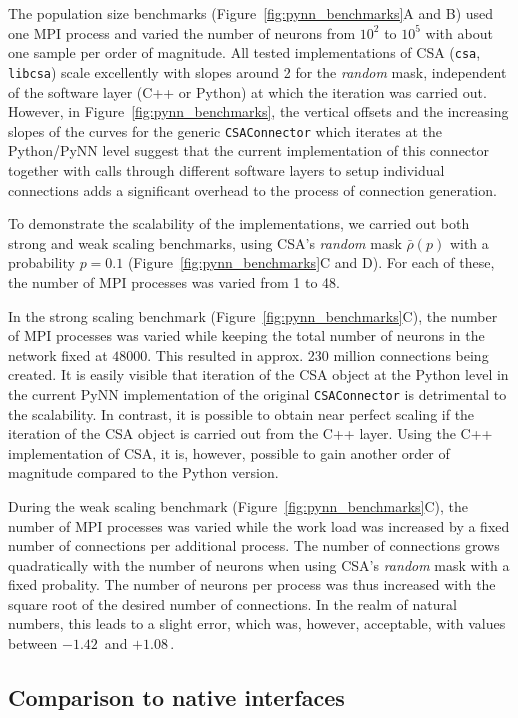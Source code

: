 \documentclass{frontiersSCNS} %
\newcommand{\permil}{\,\textperthousand\xspace}
\newcommand{\Figure}[2]{Figure~\ref{#2}}
\newcommand{\Figure}[2]{Figure~#1}
\begin{document}
The population size benchmarks (\Figure{4}{fig:pynn_benchmarks}A and
B) used one MPI process and varied the number of neurons from $10^2$
to $10^5$ with about one sample per order of magnitude. All tested
implementations of CSA (\verb|csa|, \verb|libcsa|) scale excellently
with slopes around 2 for the \emph{random} mask, independent of the
software layer (C++ or Python) at which the iteration was carried
out. However, in \Figure{4}{fig:pynn_benchmarks}, the vertical offsets
and the increasing slopes of the curves for the generic
\verb|CSAConnector| which iterates at the Python/PyNN level suggest
that the current implementation of this connector together with calls
through different software layers to setup individual connections adds
a significant overhead to the process of connection generation.

To demonstrate the scalability of the implementations, we carried out
both strong and weak scaling benchmarks, using CSA's \emph{random}
mask $\bar{\rho}(p)$ with a probability $p = 0.1$
(\Figure{4}{fig:pynn_benchmarks}C and D). For each of these, the
number of MPI processes was varied from 1 to 48.

In the strong scaling benchmark (\Figure{4}{fig:pynn_benchmarks}C),
the number of MPI processes was varied while keeping the total number
of neurons in the network fixed at $48000$. This resulted in
approx. 230 million connections being created. It is easily visible
that iteration of the CSA object at the Python level in the current
PyNN implementation of the original \verb|CSAConnector| is detrimental
to the scalability. In contrast, it is possible to obtain near perfect
scaling if the iteration of the CSA object is carried out from the C++
layer. Using the C++ implementation of CSA, it is, however, possible
to gain another order of magnitude compared to the Python version.

During the weak scaling benchmark (\Figure{4}{fig:pynn_benchmarks}C),
the number of MPI processes was varied while the work load was
increased by a fixed number of connections per additional process.
The number of connections grows quadratically with the number of
neurons when using CSA's \emph{random} mask with a fixed
probality. The number of neurons per process was thus increased with
the square root of the desired number of connections. In the realm of
natural numbers, this leads to a slight error, which was, however,
acceptable, with values between $-1.42$\permil and $+1.08$\permil.

\subsection{Comparison to native interfaces}
\end{document}
